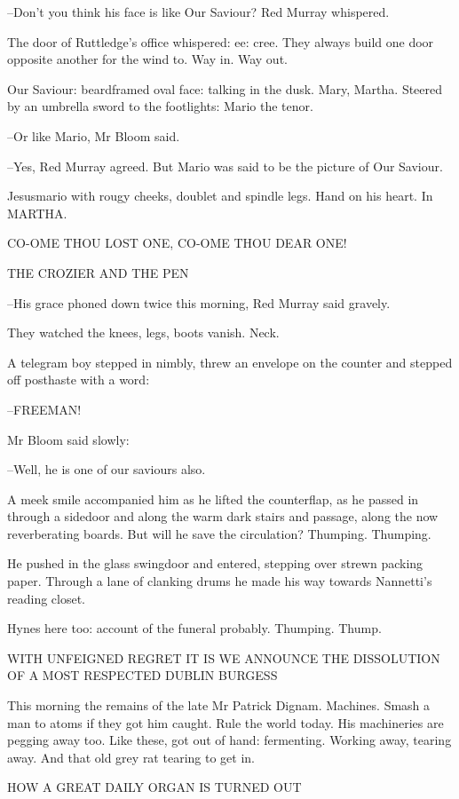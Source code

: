 --Don't you think his face is like Our Saviour? Red Murray whispered.

The door of Ruttledge's office whispered: ee: cree. They always build
one door opposite another for the wind to. Way in. Way out.

Our Saviour: beardframed oval face: talking in the dusk. Mary,
Martha. Steered by an umbrella sword to the footlights: Mario the tenor.

--Or like Mario, Mr Bloom said.

--Yes, Red Murray agreed. But Mario was said to be the picture of Our
Saviour.

Jesusmario with rougy cheeks, doublet and spindle legs. Hand on his
heart. In MARTHA.


    CO-OME THOU LOST ONE,
    CO-OME THOU DEAR ONE!


    THE CROZIER AND THE PEN


--His grace phoned down twice this morning, Red Murray said gravely.

They watched the knees, legs, boots vanish. Neck.

A telegram boy stepped in nimbly, threw an envelope on the counter
and stepped off posthaste with a word:

--FREEMAN!

Mr Bloom said slowly:

--Well, he is one of our saviours also.

A meek smile accompanied him as he lifted the counterflap, as he
passed in through a sidedoor and along the warm dark stairs and passage,
along the now reverberating boards. But will he save the circulation?
Thumping. Thumping.

He pushed in the glass swingdoor and entered, stepping over strewn
packing paper. Through a lane of clanking drums he made his way towards
Nannetti's reading closet.

Hynes here too: account of the funeral probably. Thumping. Thump.


    WITH UNFEIGNED REGRET IT IS WE ANNOUNCE THE DISSOLUTION
    OF A MOST RESPECTED DUBLIN BURGESS


This morning the remains of the late Mr Patrick Dignam. Machines.
Smash a man to atoms if they got him caught. Rule the world today. His
machineries are pegging away too. Like these, got out of hand: fermenting.
Working away, tearing away. And that old grey rat tearing to get in.


    HOW A GREAT DAILY ORGAN IS TURNED OUT


